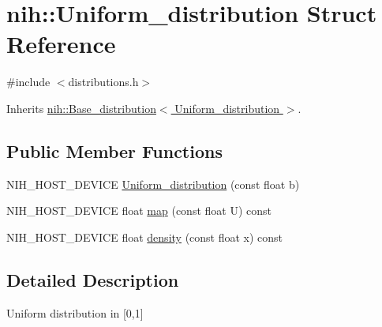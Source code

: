 \hypertarget{structnih_1_1_uniform__distribution}{
\section{nih\-:\-:\-Uniform\-\_\-distribution \-Struct \-Reference}
\label{structnih_1_1_uniform__distribution}
}


{\ttfamily \#include $<$distributions.\-h$>$}



\-Inherits \hyperlink{structnih_1_1_base__distribution}{nih\-::\-Base\-\_\-distribution$<$ Uniform\-\_\-distribution $>$}.

\subsection*{\-Public \-Member \-Functions}
\begin{DoxyCompactItemize}
\item 
\-N\-I\-H\-\_\-\-H\-O\-S\-T\-\_\-\-D\-E\-V\-I\-C\-E \hyperlink{structnih_1_1_uniform__distribution_a789a6e0b4a63ed9141a7a40a19e5ab88}{\-Uniform\-\_\-distribution} (const float b)
\item 
\-N\-I\-H\-\_\-\-H\-O\-S\-T\-\_\-\-D\-E\-V\-I\-C\-E float \hyperlink{structnih_1_1_uniform__distribution_a8ead1bb77090d5fb7a5e17fbcfbc9f8a}{map} (const float \-U) const 
\item 
\-N\-I\-H\-\_\-\-H\-O\-S\-T\-\_\-\-D\-E\-V\-I\-C\-E float \hyperlink{structnih_1_1_uniform__distribution_a99dc0a087755376979421e915055a8cb}{density} (const float x) const 
\end{DoxyCompactItemize}


\subsection{\-Detailed \-Description}
\-Uniform distribution in \mbox{[}0,1\mbox{]} 

